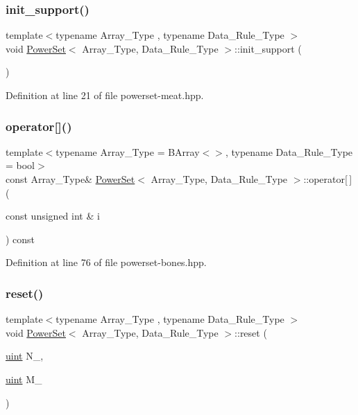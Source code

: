 \subsubsection{\texorpdfstring{init\+\_\+support()}{init\_support()}}
{\footnotesize\ttfamily template$<$typename Array\+\_\+\+Type , typename Data\+\_\+\+Rule\+\_\+\+Type $>$ \\
void \hyperlink{class_power_set}{Power\+Set}$<$ Array\+\_\+\+Type, Data\+\_\+\+Rule\+\_\+\+Type $>$\+::init\+\_\+support (\begin{DoxyParamCaption}{ }\end{DoxyParamCaption})\hspace{0.3cm}{\ttfamily [inline]}}



Definition at line 21 of file powerset-\/meat.\+hpp.

\mbox{\label{class_power_set_acc822131a9fbfd5b87f85b675f293d39}} 
\subsubsection{\texorpdfstring{operator[]()}{operator[]()}}
{\footnotesize\ttfamily template$<$typename Array\+\_\+\+Type  = B\+Array$<$$>$, typename Data\+\_\+\+Rule\+\_\+\+Type  = bool$>$ \\
const Array\+\_\+\+Type\& \hyperlink{class_power_set}{Power\+Set}$<$ Array\+\_\+\+Type, Data\+\_\+\+Rule\+\_\+\+Type $>$\+::operator\mbox{[}$\,$\mbox{]} (\begin{DoxyParamCaption}\item[{const unsigned int \&}]{i }\end{DoxyParamCaption}) const\hspace{0.3cm}{\ttfamily [inline]}}



Definition at line 76 of file powerset-\/bones.\+hpp.

\mbox{\label{class_power_set_aba11dd8802cd2eb529c7c30b55994248}} 
\subsubsection{\texorpdfstring{reset()}{reset()}}
{\footnotesize\ttfamily template$<$typename Array\+\_\+\+Type , typename Data\+\_\+\+Rule\+\_\+\+Type $>$ \\
void \hyperlink{class_power_set}{Power\+Set}$<$ Array\+\_\+\+Type, Data\+\_\+\+Rule\+\_\+\+Type $>$\+::reset (\begin{DoxyParamCaption}\item[{\hyperlink{typedefs_8hpp_a91ad9478d81a7aaf2593e8d9c3d06a14}{uint}}]{N\+\_\+,  }\item[{\hyperlink{typedefs_8hpp_a91ad9478d81a7aaf2593e8d9c3d06a14}{uint}}]{M\+\_\+ }\end{DoxyParamCaption})\hspace{0.3cm}{\ttfamily [inline]}}



